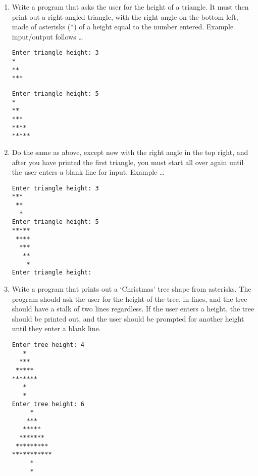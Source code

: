 \begin{enumerate}
	\item Write a program that asks the user for the height of a triangle.    It must then print out a right-angled triangle, with the right angle on the    bottom left, made of asterisks (*) of a height equal to the    number entered. Example input/output follows \ldots
\begin{lstlisting}
Enter triangle height: 3
*
**
***
\end{lstlisting}
\begin{lstlisting}
Enter triangle height: 5
*
**
***
****
*****
\end{lstlisting}
	\item Do the same as above, except now with the right angle in the top right, and after you have printed the first triangle, you must start all over again until the user enters a blank line for input. Example \ldots
\begin{lstlisting}
Enter triangle height: 3
***
 **
  *
Enter triangle height: 5
*****
 ****
  ***
   **
    *
Enter triangle height: 
\end{lstlisting}
	\item Write a program that prints out a `Christmas' tree shape from    asterisks. The program should ask the user for the height of the    tree, in lines, and the tree should have a stalk of two lines    regardless. If the user enters a height, the tree should be printed    out, and the user should be prompted for another height until they    enter a blank line.     
\begin{lstlisting}
Enter tree height: 4
   *
  ***
 *****
*******
   *
   *
Enter tree height: 6
     *
    ***
   *****
  *******
 *********
***********
     *
     *
\end{lstlisting}
\end{enumerate}    
